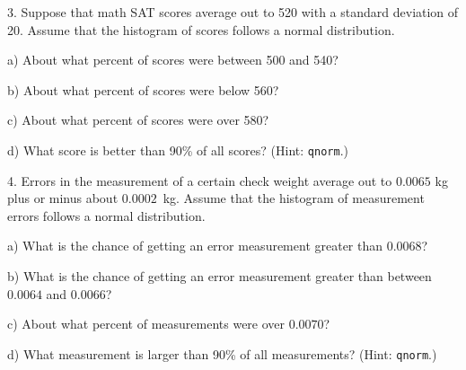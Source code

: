 \documentclass[10pt]{article}
\begin{document}
\vfill
\eject

3. Suppose that math SAT scores average out to 520 with a standard deviation of 20.
Assume that the histogram of scores follows a normal distribution.

\hspace{10pt} a) About what percent of scores were between 500 and 540?
\vspace{.8in}

\hspace{10pt} b) About what percent of scores were below 560?
\vspace{.8in}

\hspace{10pt} c) About what percent of scores were over 580?
\vspace{.8in}

\hspace{10pt} d) What score is better than 90\% of all scores? (Hint:  \texttt{qnorm}.)
\vspace{1in}

4. Errors in the measurement of a certain check weight average out to $0.0065$ kg plus or minus
about $0.0002$~kg.  Assume that the histogram of measurement errors follows a normal 
distribution.

\hspace{10pt} a) What is the chance of getting an error measurement greater than 
$0.0068$?
\vspace{.8in}

\hspace{10pt} b) What is the chance of getting an error measurement greater than 
between $0.0064$ and $0.0066$?
\vspace{.8in}

\hspace{10pt} c) About what percent of measurements  were over $0.0070$?
\vspace{.8in}

\hspace{10pt} d) What measurement is larger than 90\% of all measurements? (Hint:  \texttt{qnorm}.)
\vfill
\eject
\end{document}
